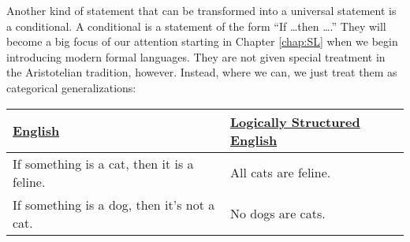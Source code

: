 %
%
%
%
%
%
%

Another kind of statement that can be transformed into a universal statement is a conditional. A conditional is a statement of the form ``If \ldots then \ldots.'' They will become a big focus of our attention starting in Chapter \ref{chap:SL} when we begin introducing modern formal languages. They are not given special treatment in the Aristotelian tradition, however. Instead, where we can, we just treat them as categorical generalizations:

\begin{longtabu}{p{.5\linewidth}p{.5\linewidth}}
\underline{English} &
\underline{Logically Structured English} \\
\endhead 
If something is a cat, then it is a feline. &
All cats are feline.\\

If something is a dog, then it's not a cat. &
No dogs are cats. \\
\end{longtabu}

